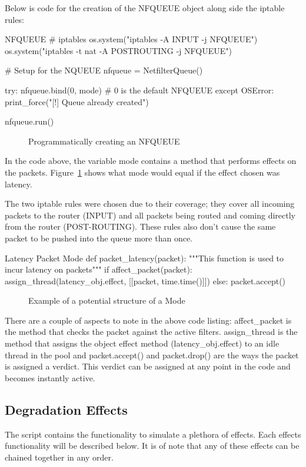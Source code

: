 Below is code for the creation of the NFQUEUE object along side the iptable rules:
\begin{Code}[]{NFQUEUE}
# iptables
os.system("iptables -A INPUT -j NFQUEUE")
os.system("iptables -t nat -A POSTROUTING -j NFQUEUE")

# Setup for the NQUEUE
nfqueue = NetfilterQueue()

try:
	nfqueue.bind(0, mode)  # 0 is the default NFQUEUE
except OSError:
	print_force("[!] Queue already created")
	
nfqueue.run()
\end{Code}
\begin{figure}[h]
	\caption{Programmatically creating an NFQUEUE}
\end{figure}

In the code above, the variable {\code mode} contains a method that performs effects on the packets. Figure~\ref{ref:latencyMode} shows what {\code mode} would equal if the effect chosen was latency.

The two iptable rules were chosen due to their coverage; they cover all incoming packets to the router (INPUT) and all packets being routed and coming directly from the router (POST-ROUTING). These rules also don't cause the same packet to be pushed into the queue more than once.

\begin{Code}{Latency Packet Mode}
def packet_latency(packet):
    """This function is used to incur latency on packets"""
    if affect_packet(packet):
        assign_thread(latency_obj.effect, [[packet, time.time()]])
    else:
        packet.accept()
\end{Code}
\begin{figure}[h]
	\caption{Example of a potential structure of a {\code Mode}}
	\label{ref:latencyMode}
\end{figure}

There are a couple of aspects to note in the above code listing:
{\code affect\_packet} is the method that checks the packet against the active filters. 
{\code assign\_thread} is the method that assigns the object effect method ({\code latency\_obj.effect}) to an idle thread in the pool and {\code packet.accept()} and {\code packet.drop()} are the ways the packet is assigned a verdict. This verdict can be assigned at any point in the code and becomes instantly active.

\clearpage
\subsection{Degradation Effects}
The script contains the functionality to simulate a plethora of effects. Each effects functionality will be described below. It is of note that any of these effects can be chained together in any order.

